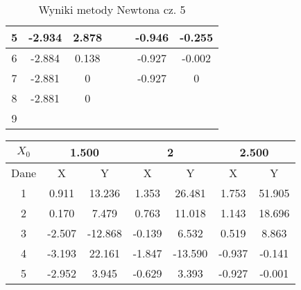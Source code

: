 \documentclass[a4paper, 11pt]{article}
\begin{document}
\begin{enumerate}
\begin{itemize}
\begin{table}[p]
\begin{tabular}{|c|c|c|c|c|c|c|}
\hline                                                          
5  & -2.934 & 2.878 &  &  & -0.946 & -0.255 \\     
\hline                                                          
6  & -2.884 & 0.138 &  &  & -0.927 & -0.002 \\     
\hline                                                          
7  & -2.881 & 0 &  &  & -0.927 & 0 \\     
\hline                                                          
8  & -2.881 & 0 &  &  &  &  \\       
\hline                                                          
9  &  &  &  &  &  &  \\        
\hline                                                          
\end{tabular}                                                   
\caption{Wyniki metody Newtona cz. 5}                           
\label{table:Wyniki metody Newtona cz. 5}                       
\end{table}                                                     
\begin{table}[p]                                                  
\centering                                                     
\begin{tabular}{|c|c|c|c|c|c|c|}                               
\hline                                                         
\( X_0 \) & \multicolumn{2}{c|}{1.500}  &\multicolumn{2}{c|}{ 2 }  & \multicolumn{2}{c|}{2.500 }\\      
\hline                                                         
Dane & X & Y & X & Y & X & Y \\                               
\hline                                                         
1  & 0.911 & 13.236 & 1.353 & 26.481 & 1.753 & 51.905 \\    
\hline                                                         
2  & 0.170 & 7.479 & 0.763 & 11.018 & 1.143 & 18.696 \\     
\hline                                                         
3  & -2.507 & -12.868 & -0.139 & 6.532 & 0.519 & 8.863 \\   
\hline                                                         
4  & -3.193 & 22.161 & -1.847 & -13.590 & -0.937 & -0.141 \\
\hline                                                         
5  & -2.952 & 3.945 & -0.629 & 3.393 & -0.927 & -0.001 \\   

\end{tabular}
\end{table}
\end{itemize}
\end{enumerate}
\end{document}
